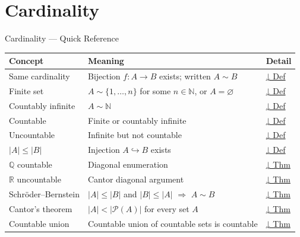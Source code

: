 \section{Cardinality}


\begin{toolkitbox}{Cardinality — Quick Reference}
\small
\begin{tabular}{l l l}
\toprule
\textbf{Concept} & \textbf{Meaning} & \textbf{Detail} \\
\midrule
Same cardinality     & Bijection $f : A \to B$ exists; written $A \sim B$            & \hyperref[def:same-cardinality]{↓ Def} \\
Finite set           & $A \sim \{1,\dots,n\}$ for some $n \in \mathbb{N}$, or $A = \varnothing$ & \hyperref[def:finite-infinite]{↓ Def} \\
Countably infinite   & $A \sim \mathbb{N}$                                           & \hyperref[def:countable]{↓ Def} \\
Countable            & Finite or countably infinite                                  & \hyperref[def:countable]{↓ Def} \\
Uncountable          & Infinite but not countable                                    & \hyperref[def:countable]{↓ Def} \\
$|A| \leq |B|$       & Injection $A \hookrightarrow B$ exists                        & \hyperref[def:cardinality-order]{↓ Def} \\
$\mathbb{Q}$ countable & Diagonal enumeration                                       & \hyperref[thm:Q-countable]{↓ Thm} \\
$\mathbb{R}$ uncountable & Cantor diagonal argument                                & \hyperref[thm:R-uncountable]{↓ Thm} \\
Schröder--Bernstein  & $|A|\leq|B|$ and $|B|\leq|A|$ $\Rightarrow$ $A \sim B$      & \hyperref[thm:schroder-bernstein]{↓ Thm} \\
Cantor's theorem     & $|A| < |\mathcal{P}(A)|$ for every set $A$                   & \hyperref[thm:cantor]{↓ Thm} \\
Countable union      & Countable union of countable sets is countable                & \hyperref[thm:countable-union]{↓ Thm} \\
\bottomrule
\end{tabular}
\end{toolkitbox}


